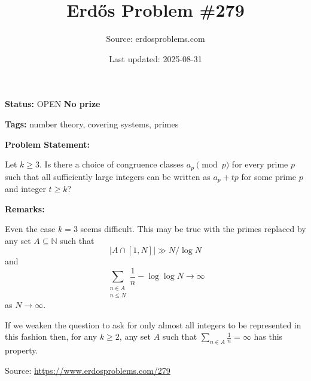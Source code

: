 \documentclass{article}
\title{Erd\H{o}s Problem \#279}
\date{Last updated: 2025-08-31}
\author{Source: erdosproblems.com}
\begin{document}
\maketitle

\noindent\textbf{Status:} OPEN \quad \textbf{No prize}

\noindent\textbf{Tags:} number theory, covering systems, primes

\medskip
\noindent\textbf{Problem Statement:}

Let $k\geq 3$. Is there a choice of congruence classes $a_p\pmod{p}$ for every prime $p$ such that all sufficiently large integers can be written as $a_p+tp$ for some prime $p$ and integer $t\geq k$?

\bigskip
\noindent\textbf{Remarks:}

Even the case $k=3$ seems difficult. This may be true with the primes replaced by any set $A\subseteq \mathbb{N}$ such that\[\lvert A\cap [1,N]\rvert \gg N/\log N\]and\[\sum_{\substack{n\in A\\ n\leq N}}\frac{1}{n} -\log\log N\to \infty\]as $N\to \infty$.

If we weaken the question to ask for only almost all integers to be represented in this fashion then, for any $k\geq 2$, any set $A$ such that $\sum_{n\in A}\frac{1}{n}=\infty$ has this property.

\bigskip
\noindent\small{Source: \url{https://www.erdosproblems.com/279}}
\end{document}
